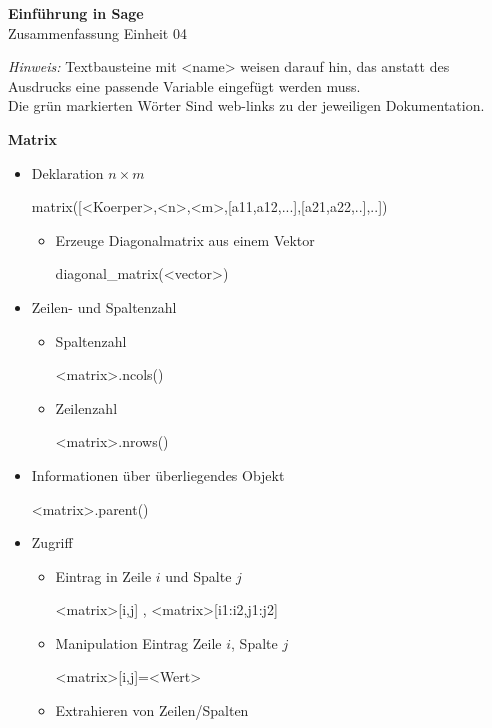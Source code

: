 \documentclass[a4paper,9pt,DIV15,twocolumn]{scrartcl}
\begin{document}
\begin{center}
    \textbf{\LARGE Einführung in Sage}\\
    {\large Zusammenfassung Einheit 04}
\end{center}
\textsl{Hinweis:} Textbausteine mit <name> weisen darauf hin, das anstatt des Ausdrucks eine passende Variable eingefügt werden muss.\\
Die {\color{Green}grün} markierten Wörter Sind web-links zu der jeweiligen Dokumentation.

\medskip
\textbf{Matrix}
\begin{itemize}
\item Deklaration $n\times m$
\begin{sagein}
matrix([<Koerper>,<n>,<m>,[a11,a12,...],[a21,a22,..],..])
\end{sagein}
\begin{itemize}
\item Erzeuge Diagonalmatrix aus einem Vektor
\begin{sagein}
diagonal_matrix(<vector>)
\end{sagein}
\end{itemize}
\item Zeilen- und Spaltenzahl
\begin{itemize}
 \item Spaltenzahl 
\begin{sagein}
<matrix>.ncols()
\end{sagein}
\item Zeilenzahl 
\begin{sagein}
<matrix>.nrows()
\end{sagein}
\end{itemize}
\item Informationen über überliegendes Objekt
\begin{sagein}
<matrix>.parent()
\end{sagein}
\item Zugriff
\begin{itemize}
 \item Eintrag in Zeile $i$ und Spalte $j$
\begin{sagein}
<matrix>[i,j] , <matrix>[i1:i2,j1:j2]
\end{sagein}
\item Manipulation Eintrag Zeile $i$, Spalte $j$
\begin{sagein}
<matrix>[i,j]=<Wert>
\end{sagein}
\item Extrahieren von Zeilen/Spalten

\end{itemize}
\end{itemize}
\end{document}

